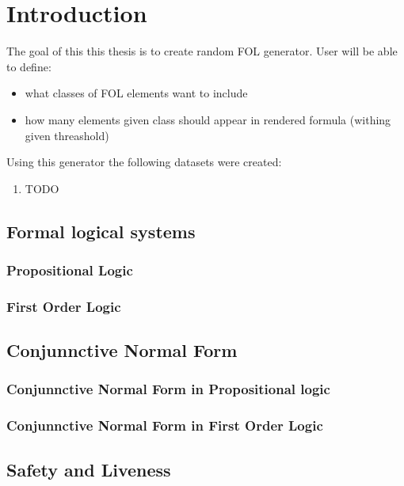 \chapter{Introduction}

The goal of this this thesis is to create random \gls{FOL} generator. User will be able to define:
\begin{itemize}
\item what classes of \gls{FOL} elements want to include
\item how many elements given class should appear in rendered formula (withing given threashold)
\end{itemize}

Using this generator the following datasets were created:
\begin{enumerate}
\item TODO
\end{enumerate}

\section{Formal logical systems}

\subsection{Propositional Logic}

\subsection{First Order Logic}

\section{Conjunnctive Normal Form}

\subsection{Conjunnctive Normal Form in Propositional logic}

\subsection{Conjunnctive Normal Form in First Order Logic}

\section{Safety and Liveness}

